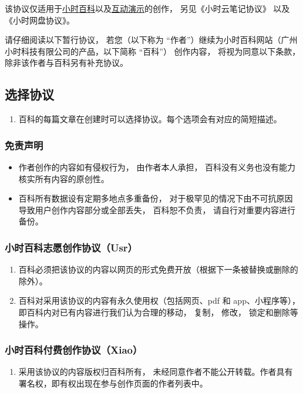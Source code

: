
该协议仅适用于\href{http://wuli.wiki/online/}{小时百科}以及\href{http://wuli.wiki/apps/}{互动演示}的创作， 另见《小时云笔记协议》 以及《小时网盘协议》。

请仔细阅读以下暂行协议， 若您（以下称为 “作者”）继续为小时百科网站（广州小时科技有限公司的产品，以下简称 “百科”） 创作内容， 将视为同意以下条款， 除非该作者与百科另有补充协议。

\subsection{选择协议}
\begin{enumerate}
\item 百科的每篇文章在创建时可以选择协议。每个选项会有对应的简短描述。
\end{enumerate}

\subsubsection{免责声明}
\begin{itemize}
\item 作者创作的内容如有侵权行为， 由作者本人承担， 百科没有义务也没有能力核实所有内容的原创性。
\item 百科所有数据设有定期多地点多重备份， 对于极罕见的情况下由不可抗原因导致用户创作内容部分或全部丢失， 百科恕不负责， 请自行对重要内容进行备份。
\end{itemize}

\subsubsection{小时百科志愿创作协议（Usr）}
\begin{enumerate}
\item 百科必须把该协议的内容以网页的形式免费开放（根据下一条被替换或删除的除外）。
\item 百科对采用该协议的内容有永久使用权（包括网页、pdf 和 app、小程序等）， 即百科内对已有内容进行我们认为合理的移动， 复制， 修改， 锁定和删除等操作。
\end{enumerate}

\subsubsection{小时百科付费创作协议（Xiao）}
\begin{enumerate}
\item 采用该协议的内容版权归百科所有， 未经同意作者不能公开转载。作者具有署名权，即有权出现在参与创作页面的作者列表中。
\end{enumerate}

